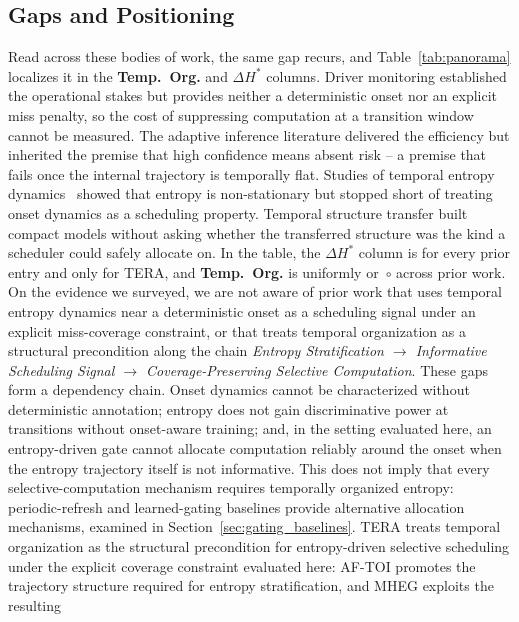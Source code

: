 \documentclass[a4paper,fleqn]{cas-dc}
\newcommand{\AFTOI}{\mbox{AF-TOI}\xspace}
\newcommand{\MHEG}{\mbox{MHEG}\xspace}
\begin{document}
\subsection{Gaps and Positioning}
\label{sec:rel_gap}
Read across these bodies of work, the same gap recurs, and Table~\ref{tab:panorama}
localizes it in the \textbf{Temp.~Org.} and \textbf{$\Delta H^{\ast}$} columns. Driver
monitoring established the operational stakes but provides neither a
deterministic onset nor an explicit miss penalty, so the cost of suppressing
computation at a transition window cannot be measured. The adaptive inference
literature delivered the efficiency but inherited the premise that high confidence
means absent risk -- a premise that fails once the internal trajectory is
temporally flat. Studies of temporal entropy
dynamics~\cite{braverman2020calib,dera2023trust}
showed that entropy is non-stationary but stopped short of treating onset
dynamics as a scheduling property. Temporal
structure transfer built compact models without asking whether the transferred
structure was the kind a scheduler could safely allocate on. In the table, the
\textbf{$\Delta H^{\ast}$} column is  for every prior entry and
 only for TERA, and \textbf{Temp.~Org.} is uniformly  or~$\circ$
across prior work. On the evidence we surveyed, we are not aware of prior work that
uses temporal entropy dynamics near a deterministic onset as a scheduling signal
under an explicit miss-coverage constraint, or that treats temporal organization as
a structural precondition along the chain
\emph{Entropy Stratification $\rightarrow$ Informative Scheduling Signal $\rightarrow$
Coverage-Preserving Selective Computation}.
These gaps form a dependency chain. Onset dynamics cannot be characterized
without deterministic annotation; entropy does not gain discriminative power at
transitions without onset-aware training; and, {\color{\revcolor}in the
setting evaluated here, an entropy-driven gate cannot allocate computation
reliably around the onset when the entropy trajectory itself is not
informative. This does not imply that every selective-computation mechanism
requires temporally organized entropy: periodic-refresh and learned-gating
baselines provide alternative allocation mechanisms, examined in
Section~\ref{sec:gating_baselines}.} TERA treats temporal organization as the
structural precondition for entropy-driven selective scheduling under the
explicit coverage constraint evaluated here: \AFTOI promotes the trajectory
structure required for entropy stratification, and \MHEG exploits the resulting
\end{document}
